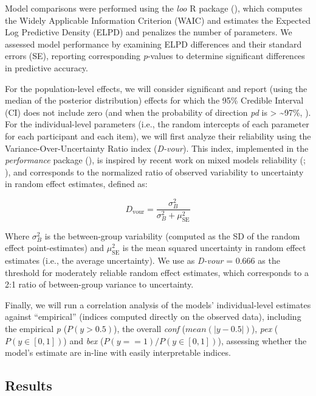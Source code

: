 \documentclass[
  jou,
  floatsintext,
  longtable,
  nolmodern,
  notxfonts,
  notimes,
  colorlinks=true,linkcolor=blue,citecolor=blue,urlcolor=blue]{apa7}
\begin{document}
Model comparisons were performed using the \emph{loo} R package
(), which
computes the Widely Applicable Information Criterion (WAIC) and
estimates the Expected Log Predictive Density (ELPD) and penalizes the
number of parameters. We assessed model performance by examining ELPD
differences and their standard errors (SE), reporting corresponding
\emph{p}-values to determine significant differences in predictive
accuracy.

For the population-level effects, we will consider significant and
report (using the median of the posterior distribution) effects for
which the 95\% Credible Interval (CI) does not include zero (and when
the probability of direction \emph{pd} is \textgreater{}
\textasciitilde97\%, ). For the individual-level parameters (i.e.,
the random intercepts of each parameter for each participant and each
item), we will first analyze their reliability using the
Variance-Over-Uncertainty Ratio index (\emph{D-vour}). This index,
implemented in the \emph{performance} package
(), is
inspired by recent work on mixed models reliability
(;
), and
corresponds to the normalized ratio of observed variability to
uncertainty in random effect estimates, defined as:

\[
D_{\text{vour}} = \frac{\sigma_B^2}{\sigma_B^2 + \mu_{\text{SE}}^2}
\]

Where \(\sigma_B^2\) is the between-group variability (computed as the
SD of the random effect point-estimates) and \(\mu_{\text{SE}}^2\) is
the mean squared uncertainty in random effect estimates (i.e., the
average uncertainty). We use as \emph{D-vour} = 0.666 as the threshold
for moderately reliable random effect estimates, which corresponds to a
2:1 ratio of between-group variance to uncertainty.

Finally, we will run a correlation analysis of the models'
individual-level estimates against ``empirical'' (indices computed
directly on the observed data), including the empirical \emph{p}
(\(P(y > 0.5)\)), the overall \emph{conf} (\(mean(|y - 0.5|)\)),
\emph{pex} (\(P(y \in [0, 1])\)) and \emph{bex}
(\(P(y == 1) / P(y \in [0, 1])\)), assessing whether the model's
estimate are in-line with easily interpretable indices.

\subsection{Results}\label{results}
\end{document}
